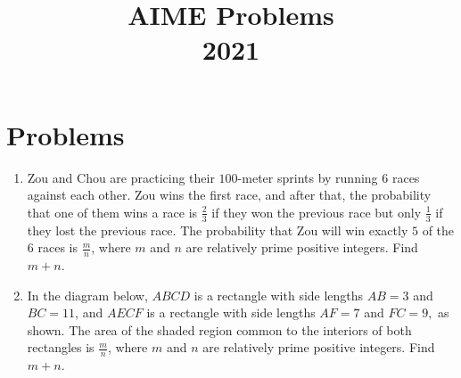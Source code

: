 \documentclass{article}
\title{AIME Problems \\ 2021}
\date{}
\begin{document}
\maketitle\thispagestyle{fancy}\newpage\section*{Problems}\begin{enumerate}[label=\arabic*., itemsep=0.5em]\item Zou and Chou are practicing their $100$-meter sprints by running $6$ races against each other. Zou wins the first race, and after that, the probability that one of them wins a race is $\frac23$ if they won the previous race but only $\frac13$ if they lost the previous race. The probability that Zou will win exactly $5$ of the $6$ races is $\frac mn$, where $m$ and $n$ are relatively prime positive integers. Find $m+n$.\par \vspace{0.5em}\item In the diagram below, $ABCD$ is a rectangle with side lengths $AB=3$ and $BC=11$, and $AECF$ is a rectangle with side lengths $AF=7$ and $FC=9,$ as shown. The area of the shaded region common to the interiors of both rectangles is $\frac mn$, where $m$ and $n$ are relatively prime positive integers. Find $m+n$.



\end{enumerate}
\end{document}
